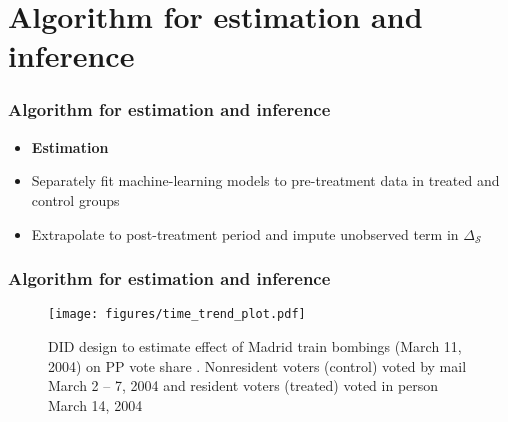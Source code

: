 \documentclass[table, xcolor = {dvipsnames}, 9pt]{beamer}
\theoremstyle{plain}
\begin{document}
\section{Algorithm for estimation and inference}
\begin{frame}[t]
\frametitle{Algorithm for estimation and inference}
\vfill
\begin{itemize}
\item[] \textbf{Estimation} \vfill
\item \pause Separately fit machine-learning models to pre-treatment data in treated and control groups \vfill
\item \pause Extrapolate to post-treatment period and impute unobserved term in $\Delta_{\mathcal{S}}$ \vfill
\end{itemize}
\vfill
\end{frame}
\begin{frame}[t]
\frametitle{Algorithm for estimation and inference}
\vfill
\begin{figure}
\texttt{[image: figures/time\_trend\_plot.pdf]}
\caption{DID design to estimate effect of Madrid train bombings (March 11, 2004) on PP vote share \citep{montalvo2011}. Nonresident voters (control) voted by mail March 2 -- 7, 2004 and resident voters (treated) voted in person March 14, 2004}
\end{figure}
\vfill
\end{frame}
\end{document}
